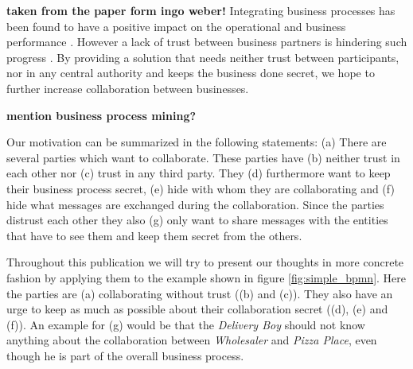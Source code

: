 \documentclass[runningheads]{llncs}
\newcommand{\comment}[1]{}
\newcommand{\ber}[1]{(\lowercase\expandafter{#1\relax})} %
\begin{document}
\textbf{taken from the paper form ingo weber!}
Integrating business processes has been found to have a positive impact on the operational and business performance \cite{flynn2010impact,narayanan2011antecedents}. However a lack of trust between business partners is hindering such progress \cite{panayides2009impact}. By providing a solution that needs neither trust between participants, nor in any central authority and keeps the business done secret, we hope to further increase collaboration between businesses. 

\textbf{mention business process mining?} \cite{van2007business}



Our motivation can be summarized in the following statements: \ber{a} There are several parties which want to collaborate. These parties have \ber{b} neither trust in each other nor \ber{c} trust in any third party. They \ber{d} furthermore want to keep their business process secret, \ber{e} hide with whom they are collaborating and \ber{f} hide what messages are exchanged during the collaboration. Since the parties distrust each other they also \ber{g} only want to share messages with the entities that have to see them and keep them secret from the others.

\comment{
\begin{itemize}
    \item there are several parties who want to collaborate 
    \item parties have no trust in each other 
    \item parties have no trust in a third party
    \item parties have strong interest in keeping things secret
\end{itemize}
}




Throughout this publication we will try to present our thoughts in more concrete fashion by applying them to the example shown in figure \ref{fig:simple_bpmn}. Here the parties are \ber{a} collaborating without trust (\ber{b} and \ber{c}). They also have an urge to keep as much as possible about their collaboration secret (\ber{d}, \ber{e} and \ber{f}). An example for \ber{g} would be that the \textit{Delivery Boy} should not know anything about the collaboration between \textit{Wholesaler} and \textit{Pizza Place}, even though he is part of the overall business process. 

\comment{
It displays the process of ordering, making and delivering pizza. In the process the \textit{Pizza Place} can decide weather to deliver straight away, using the \textit{Delivery Boy} as a middle man, or if it has order ingredients at the \textit{Wholesaler}. We chose a choreography diagram to display the process in order to emphasis the collaboration between the participants. Please keep in mind that in reality business processes might be much more complex and may involve many more participants. The example is kept simple on purpose and only serves as an illustration for our approach. 
}
\end{document}
